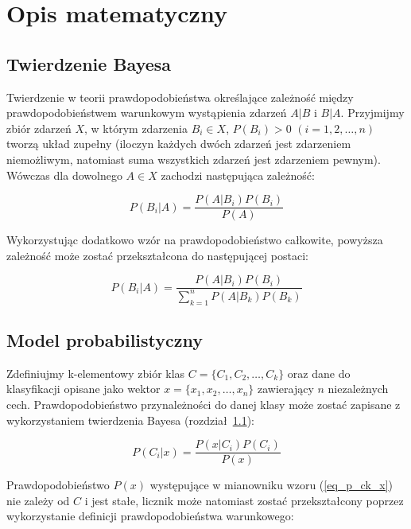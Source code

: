 \section{Opis matematyczny}
\label{sec_opis_mat}

\subsection{Twierdzenie Bayesa}
\label{subsec_tw_bayesa}
Twierdzenie w teorii prawdopodobieństwa określające zależność między prawdopodobieństwem warunkowym wystąpienia zdarzeń $A|B$ i $B|A$. Przyjmijmy zbiór zdarzeń $X$, w którym zdarzenia $B_i \in X$, $P(B_i)>0$ ${(i=1,2, \dots , n)}$ tworzą układ zupełny (iloczyn każdych dwóch zdarzeń jest zdarzeniem niemożliwym, natomiast suma wszystkich zdarzeń jest zdarzeniem pewnym). Wówczas dla dowolnego $A \in X$ zachodzi następująca zależność:

	\begin{equation}
	\label{eq_tw_bayesa_1}
		P(B_i | A) = \frac{P(A | B_i) P(B_i)}{P(A)}
	\end{equation}

Wykorzystując dodatkowo wzór na prawdopodobieństwo całkowite, powyższa zależność może zostać przekształcona do następującej postaci:

	\begin{equation}
	\label{eq_tw_bayesa_2}
		P(B_i | A) = \frac{P(A | B_i) P(B_i)}{\sum_{k=1}^{n} P(A | B_k)P(B_k)}
	\end{equation}


\subsection{Model probabilistyczny}
\label{subsec_model}

Zdefiniujmy k-elementowy zbiór klas $C = {\{C_1, C_2, \dots, C_k\}}$ oraz dane do klasyfikacji opisane jako wektor ${x = \{x_1, x_2, \dots, x_n\}}$ zawierający $n$ niezależnych cech. Prawdopodobieństwo przynależności do danej klasy może zostać zapisane z wykorzystaniem twierdzenia Bayesa (rozdział~\ref{subsec_tw_bayesa}):

	\begin{equation}
	\label{eq_p_ck_x}
		P(C_i | x) = \frac{P(x | C_i) P(C_i)}{P(x)}
	\end{equation}

Prawdopodobieństwo $P(x)$ występujące w mianowniku wzoru (\ref{eq_p_ck_x}) nie zależy od $C$ i jest stałe, licznik może natomiast zostać przekształcony poprzez wykorzystanie definicji prawdopodobieństwa warunkowego:

